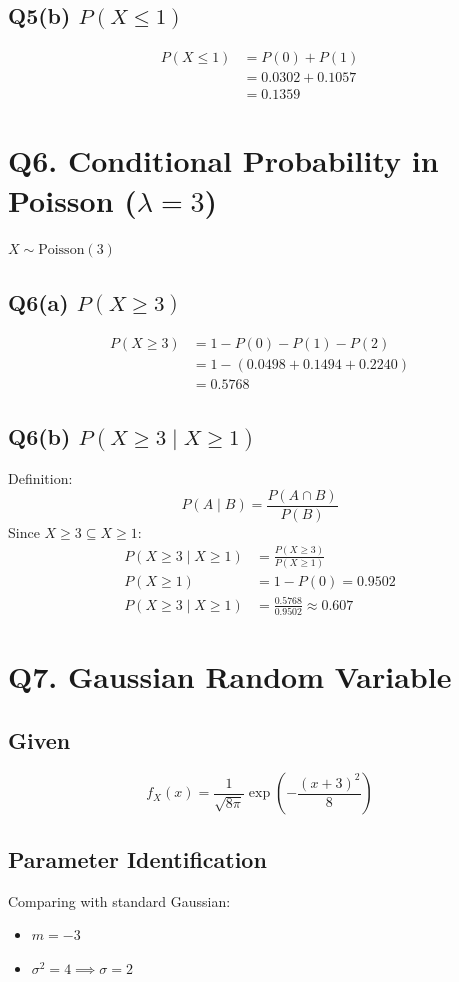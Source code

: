 \documentclass[11pt]{article}
\begin{document}
\subsection{Q5(b) $P(X \le 1)$}
\begin{align*}
    P(X \le 1) &= P(0) + P(1) \\
    &= 0.0302 + 0.1057 \\
    &= 0.1359
\end{align*}

\section{Q6. Conditional Probability in Poisson ($\lambda = 3$)}
$X \sim \text{Poisson}(3)$

\subsection{Q6(a) $P(X \ge 3)$}
\begin{align*}
    P(X \ge 3) &= 1 - P(0) - P(1) - P(2) \\
    &= 1 - (0.0498 + 0.1494 + 0.2240) \\
    &= 0.5768
\end{align*}

\subsection{Q6(b) $P(X \ge 3 \mid X \ge 1)$}
Definition:
\[ P(A \mid B) = \frac{P(A \cap B)}{P(B)} \]
Since $X \ge 3 \subseteq X \ge 1$:
\begin{align*}
    P(X \ge 3 \mid X \ge 1) &= \frac{P(X \ge 3)}{P(X \ge 1)} \\
    P(X \ge 1) &= 1 - P(0) = 0.9502 \\
    P(X \ge 3 \mid X \ge 1) &= \frac{0.5768}{0.9502} \approx 0.607
\end{align*}

\section{Q7. Gaussian Random Variable}

\subsection{Given}
\[ f_X(x) = \frac{1}{\sqrt{8\pi}} \exp\left(-\frac{(x+3)^2}{8}\right) \]

\subsection{Parameter Identification}
Comparing with standard Gaussian:
\begin{itemize}
    \item $m = -3$
    \item $\sigma^2 = 4 \implies \sigma = 2$
\end{itemize}
\end{document}
